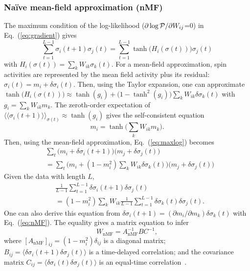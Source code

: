 \documentclass[prx,twocolumn,twoside,showpacs,superscriptaddress]{revtex4-1}
\begin{document}
\subsubsection*{Na{\"i}ve mean-field approximation (nMF)}
The maximum condition of the log-likelihood ($\partial \log {\cal{P}}/\partial W_{ij}$=0) in Eq.~(\ref{eq:gradient}) gives 
\begin{equation}
\label{eq:maxlog}
\sum_{t=1}^{L-1} \sigma_i(t+1) \sigma_j(t) = \sum_{t=1}^{L-1} \tanh \big(H_i(\sigma(t)) \big) \sigma_j(t)
\end{equation}
with $H_i(\sigma(t))=\sum_k W_{ik} \sigma_k(t)$.
For a mean-field approximation, spin activities are represented by the mean field activity plus its residual: $\sigma_i(t) = m_i + \delta \sigma_i(t)$.
Then, using the Taylor expansion, one can approximate $\tanh \big(H_i(\sigma(t)) \big) \approx \tanh (g_i) + \big( 1 - \tanh^2 (g_i ) \big) \sum_k W_{ik} \delta \sigma_k(t)$ with $g_i = \sum_k W_{ik} m_k$.
The zeroth-order expectation of $\langle \langle \sigma_i(t+1) \rangle \rangle_{\sigma(t)} \approx \tanh (g_i)$ gives the self-consistent equation
\begin{equation}
\label{eq:nMF}
m_i = \tanh \big( \sum_k W_{ik} m_k \big).
\end{equation}
Then, using the mean-field approximation, Eq.~(\ref{eq:maxlog}) becomes
\begin{align}
&\sum_t \big( m_i + \delta \sigma_i(t+1) \big) \big( m_j + \delta \sigma_j(t) \big) \nonumber \\
&= \sum_t \big( m_i + (1-m_i^2) \sum_k W_{ik} \delta \sigma_k(t) \big) \big( m_j + \delta \sigma_j(t) \big)
\end{align}
Given the data with length $L$,
\begin{align}
&\frac{1}{L-1} \sum_{t=1}^{L-1} \delta \sigma_i(t+1) \delta \sigma_j(t) \nonumber \\
&= (1-m_i^2) \sum_k W_{ik} \frac{1}{L-1} \sum_{t=1}^{L-1} \delta \sigma_k(t) \delta \sigma_j(t). 
\end{align}
One can also derive this equation from $\delta \sigma_i (t+1) = (\partial m_i/\partial m_k) \delta \sigma_k(t)$ with Eq.~(\ref{eq:nMF}).
The equality gives a matrix equation to infer
\begin{equation}
W_{\text{nMF}}=A_{\text{nMF}}^{-1} B C^{-1},
\end{equation}
where $[A_{\text{nMF}}]_{ij} = (1-m_i^2) \delta_{ij}$ is a diagonal matrix; $B_{ij} = \langle \delta \sigma_i(t+1) \delta \sigma_j(t) \rangle$ is a time-delayed correlation; and the covariance matrix $C_{ij} = \langle \delta \sigma_i(t) \delta \sigma_j(t) \rangle$ is an equal-time correlation~\cite{Roudi2011}.
\end{document}
